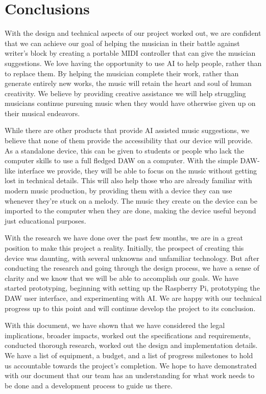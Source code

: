 \section{Conclusions}

With the design and technical aspects of our project worked out, we are confident that we
can achieve our goal of helping the musician in their battle against writer's block by
creating a portable MIDI controller that can give the musician suggestions. We love having
the opportunity to use AI to help people, rather than to replace them. By helping the
musician complete their work, rather than generate entirely new works, the music will
retain the heart and soul of human creativity. We believe by providing creative assistance
we will help struggling musicians continue pursuing music when they would have otherwise
given up on their musical endeavors.

While there are other products that provide AI assisted music suggestions, we believe that
none of them provide the accessibility that our device will provide. As a standalone
device, this can be given to students or people who lack the computer skills to use a full
fledged DAW on a computer. With the simple DAW-like interface we provide, they will be
able to focus on the music without getting lost in technical details. This will also help
those who are already familiar with modern music production, by providing them with a
device they can use whenever they're stuck on a melody. The music they create on the
device can be imported to the computer when they are done, making the device useful beyond
just educational purposes.

With the research we have done over the past few months, we are in a great position to
make this project a reality. Initially, the prospect of creating this device was daunting,
with several unknowns and unfamiliar technology. But after conducting the research and
going through the design process, we have a sense of clarity and we know that we will be
able to accomplish our goals. We have started prototyping, beginning with setting up the
Raspberry Pi, prototyping the DAW user interface, and experimenting with AI. We are happy
with our technical progress up to this point and will continue develop the project to its
conclusion.

With this document, we have shown that we have considered the legal implications, broader
impacts, worked out the specifications and requirements, conducted thorough research,
worked out the design and implementation details. We have a list of equipment, a budget,
and a list of progress milestones to hold us accountable towards the project's completion.
We hope to have demonstrated with our document that our team has an understanding for what
work needs to be done and a development process to guide us there.